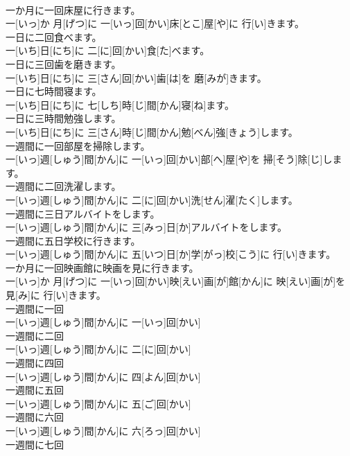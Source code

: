 \documentclass[8pt]{extreport}
\begin{document}
\begin{CJK}{UTF8}{min}
\\	一か月に一回床屋に行きます。	
\\	一[いっ]か 月[げつ]に 一[いっ]回[かい]床[とこ]屋[や]に 行[い]きます。
\\	一日に二回食べます。	
\\	一[いち]日[にち]に 二[に]回[かい]食[た]べます。
\\	一日に三回歯を磨きます。	
\\	一[いち]日[にち]に 三[さん]回[かい]歯[は]を 磨[みが]きます。
\\	一日に七時間寝ます。	
\\	一[いち]日[にち]に 七[しち]時[じ]間[かん]寝[ね]ます。
\\	一日に三時間勉強します。	
\\	一[いち]日[にち]に 三[さん]時[じ]間[かん]勉[べん]強[きょう]します。
\\	一週間に一回部屋を掃除します。	
\\	一[いっ]週[しゅう]間[かん]に 一[いっ]回[かい]部[へ]屋[や]を 掃[そう]除[じ]します。
\\	一週間に二回洗濯します。	
\\	一[いっ]週[しゅう]間[かん]に 二[に]回[かい]洗[せん]濯[たく]します。
\\	一週間に三日アルバイトをします。	
\\	一[いっ]週[しゅう]間[かん]に 三[みっ]日[か]アルバイトをします。
\\	一週間に五日学校に行きます。	
\\	一[いっ]週[しゅう]間[かん]に 五[いつ]日[か]学[がっ]校[こう]に 行[い]きます。
\\	一か月に一回映画館に映画を見に行きます。	
\\	一[いっ]か 月[げつ]に 一[いっ]回[かい]映[えい]画[が]館[かん]に 映[えい]画[が]を 見[み]に 行[い]きます。
\\	一週間に一回	
\\	一[いっ]週[しゅう]間[かん]に 一[いっ]回[かい]
\\	一週間に二回	
\\	一[いっ]週[しゅう]間[かん]に 二[に]回[かい]
\\	一週間に四回	
\\	一[いっ]週[しゅう]間[かん]に 四[よん]回[かい]
\\	一週間に五回	
\\	一[いっ]週[しゅう]間[かん]に 五[ご]回[かい]
\\	一週間に六回	
\\	一[いっ]週[しゅう]間[かん]に 六[ろっ]回[かい]
\\	一週間に七回	

\end{CJK}
\end{document}
